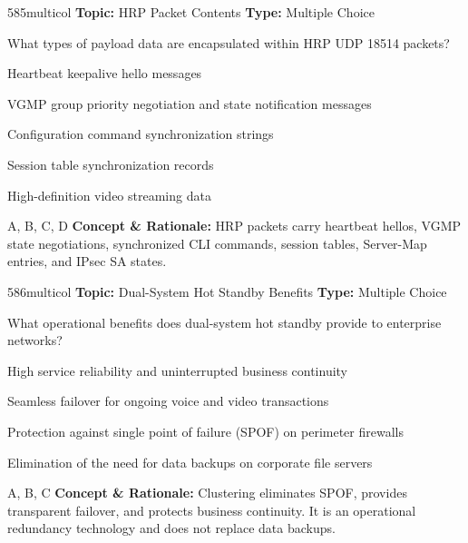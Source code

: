 \begin{qcard}{585}{multicol}
\textcolor{darkslate!75}{\small\textbf{Topic:} HRP Packet Contents \hfill \textbf{Type:} Multiple Choice}\vspace{0.4em}\par
What types of payload data are encapsulated within HRP UDP 18514 packets?
\begin{qoptions}
\item Heartbeat keepalive hello messages
\item VGMP group priority negotiation and state notification messages
\item Configuration command synchronization strings
\item Session table synchronization records
\item High-definition video streaming data
\end{qoptions}
\end{qcard}
\nopagebreak
\begin{explainbox}{A, B, C, D}
\textbf{Concept \& Rationale:} HRP packets carry heartbeat hellos, VGMP state negotiations, synchronized CLI commands, session tables, Server-Map entries, and IPsec SA states.
\end{explainbox}

\begin{qcard}{586}{multicol}
\textcolor{darkslate!75}{\small\textbf{Topic:} Dual-System Hot Standby Benefits \hfill \textbf{Type:} Multiple Choice}\vspace{0.4em}\par
What operational benefits does dual-system hot standby provide to enterprise networks?
\begin{qoptions}
\item High service reliability and uninterrupted business continuity
\item Seamless failover for ongoing voice and video transactions
\item Protection against single point of failure (SPOF) on perimeter firewalls
\item Elimination of the need for data backups on corporate file servers
\end{qoptions}
\end{qcard}
\nopagebreak
\begin{explainbox}{A, B, C}
\textbf{Concept \& Rationale:} Clustering eliminates SPOF, provides transparent failover, and protects business continuity. It is an operational redundancy technology and does not replace data backups.
\end{explainbox}

